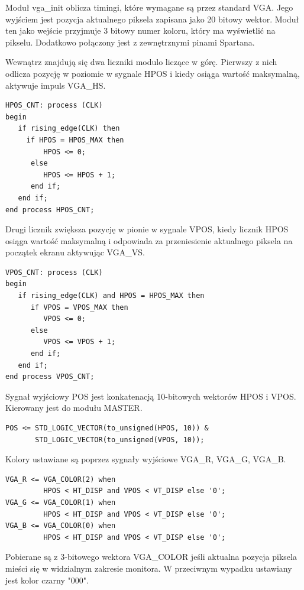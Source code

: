\documentclass[11pt]{article}
\begin{document}
Moduł vga\_init oblicza timingi, które wymagane są przez standard VGA.
Jego wyjściem jest pozycja aktualnego piksela zapisana jako 20 bitowy wektor.
Moduł ten jako wejście przyjmuje 3 bitowy numer koloru, który ma wyświetlić na pikselu.
Dodatkowo połączony jest z zewnętrznymi pinami Spartana.

Wewnątrz znajdują się dwa liczniki modulo liczące w górę.
Pierwszy z nich odlicza pozycję w poziomie w sygnale HPOS i kiedy osiąga wartość maksymalną, aktywuje impuls VGA\_HS.

\begin{lstlisting}[caption=Sterowanie pozycją piksela w poziomie]
HPOS_CNT: process (CLK) 
begin
   if rising_edge(CLK) then
     if HPOS = HPOS_MAX then
         HPOS <= 0;
      else
         HPOS <= HPOS + 1;
      end if;
   end if;
end process HPOS_CNT;
\end{lstlisting}

Drugi licznik zwiększa pozycję w pionie w sygnale VPOS, kiedy licznik HPOS osiąga wartość maksymalną i odpowiada za przeniesienie aktualnego piksela na początek ekranu aktywując VGA\_VS.
\newpage
\begin{lstlisting}[caption=Sterowanie pozycją piksela w pionie]
VPOS_CNT: process (CLK) 
begin
   if rising_edge(CLK) and HPOS = HPOS_MAX then
      if VPOS = VPOS_MAX then
         VPOS <= 0;
      else
         VPOS <= VPOS + 1;
      end if;
   end if;
end process VPOS_CNT;
\end{lstlisting}

Sygnał wyjściowy POS jest konkatenacją 10-bitowych wektorów HPOS i VPOS. 
Kierowany jest do modułu MASTER.

\begin{lstlisting}[caption=Przypisanie wektora z pozycją piksela]
POS <= STD_LOGIC_VECTOR(to_unsigned(HPOS, 10)) &
       STD_LOGIC_VECTOR(to_unsigned(VPOS, 10));
\end{lstlisting}

Kolory ustawiane są poprzez sygnały wyjściowe VGA\_R, VGA\_G, VGA\_B.

\begin{lstlisting}[caption=Ustawienie kolorów]
VGA_R <= VGA_COLOR(2) when
         HPOS < HT_DISP and VPOS < VT_DISP else '0';
VGA_G <= VGA_COLOR(1) when
         HPOS < HT_DISP and VPOS < VT_DISP else '0';
VGA_B <= VGA_COLOR(0) when
         HPOS < HT_DISP and VPOS < VT_DISP else '0';
\end{lstlisting}

Pobierane są z 3-bitowego wektora VGA\_COLOR jeśli aktualna pozycja piksela mieści się w widzialnym zakresie monitora.
W przeciwnym wypadku ustawiany jest kolor czarny "000".
\end{document}
